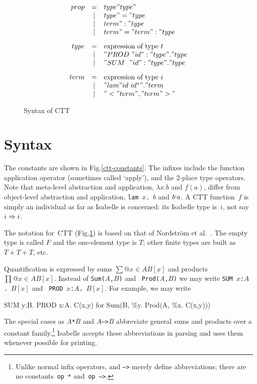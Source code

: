 \begin{figure}
\begin{center}
\dquotes
\[ \begin{array}{rcl}
prop    & = &  type " type"       \\
        & | & type " = " type     \\
        & | & term " : " type        \\
        & | & term " = " term " : " type 
\\[2ex]
type    & = & \hbox{expression of type~$t$} \\
        & | & "PROD~" id " : " type " . " type  \\
        & | & "SUM~~" id " : " type " . " type 
\\[2ex]
term    & = & \hbox{expression of type~$i$} \\
        & | & "lam " id~id^* " . " term   \\
        & | & "< " term " , " term " >"
\end{array} 
\]
\end{center}
\caption{Syntax of CTT} \label{ctt-syntax}
\end{figure}



\section{Syntax}
The constants are shown in Fig.\ts\ref{ctt-constants}.  The infixes include
the function application operator (sometimes called `apply'), and the 2-place
type operators.  Note that meta-level abstraction and application, $\lambda
x.b$ and $f(a)$, differ from object-level abstraction and application,
\hbox{\tt lam $x$. $b$} and $b{\tt`}a$.  A CTT function~$f$ is simply an
individual as far as Isabelle is concerned: its Isabelle type is~$i$, not say
$i\Rightarrow i$.

The notation for~CTT (Fig.\ts\ref{ctt-syntax}) is based on that of Nordstr\"om
et al.~\cite{nordstrom90}.  The empty type is called $F$ and the one-element
type is $T$; other finite types are built as $T+T+T$, etc.

Quantification is expressed by sums $\sum@{x\in A}B[x]$ and
products $\prod@{x\in A}B[x]$.  Instead of {\tt Sum($A$,$B$)} and {\tt
  Prod($A$,$B$)} we may write \hbox{\tt SUM $x$:$A$.\ $B[x]$} and \hbox{\tt
  PROD $x$:$A$.\ $B[x]$}.  For example, we may write
\begin{ttbox}
SUM y:B. PROD x:A. C(x,y)   {\rm for}   Sum(B, \%y. Prod(A, \%x. C(x,y)))
\end{ttbox}
The special cases as \hbox{\tt$A$*$B$} and \hbox{\tt$A$-->$B$} abbreviate
general sums and products over a constant family.\footnote{Unlike normal
infix operators, {\tt*} and {\tt-->} merely define abbreviations; there are
no constants~{\tt op~*} and~\hbox{\tt op~-->}.}  Isabelle accepts these
abbreviations in parsing and uses them whenever possible for printing.


